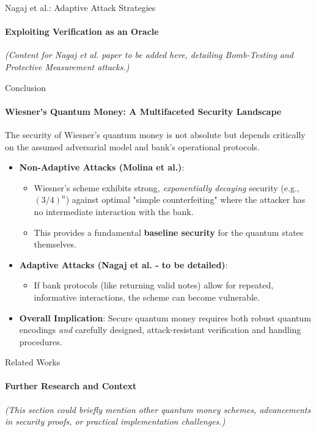 \documentclass{beamer}
\begin{document}
\begin{frame}{Nagaj et al.: Adaptive Attack Strategies}
    \framesubtitle{Exploiting Verification as an Oracle}
    \vspace{1cm}
    \centering
    \textit{(Content for Nagaj et al. paper to be added here, detailing Bomb-Testing and Protective Measurement attacks.)}
\end{frame}


\begin{frame}{Conclusion}
    \framesubtitle{Wiesner's Quantum Money: A Multifaceted Security Landscape}
    The security of Wiesner's quantum money is not absolute but depends critically on the assumed adversarial model and bank's operational protocols.
    \pause
    \begin{itemize}
        \item \textbf{Non-Adaptive Attacks (Molina et al.)}:
            \begin{itemize}
                \item Wiesner's scheme exhibits strong, \textit{exponentially decaying} security (e.g., $(3/4)^n$) against optimal "simple counterfeiting" where the attacker has no intermediate interaction with the bank.
                \item This provides a fundamental \textbf{baseline security} for the quantum states themselves.
            \end{itemize}
        \pause
        \item \textbf{Adaptive Attacks (Nagaj et al. - to be detailed)}:
            \begin{itemize}
                \item If bank protocols (like returning valid notes) allow for repeated, informative interactions, the scheme can become vulnerable.
            \end{itemize}
        \pause
        \item \textbf{Overall Implication}: Secure quantum money requires both robust quantum encodings \textit{and} carefully designed, attack-resistant verification and handling procedures.
    \end{itemize}
\end{frame}


\begin{frame}{Related Works}
    \framesubtitle{Further Research and Context}
    \vspace{1cm}
    \centering
    \textit{(This section could briefly mention other quantum money schemes, advancements in security proofs, or practical implementation challenges.)}
\end{frame}
\end{document}
